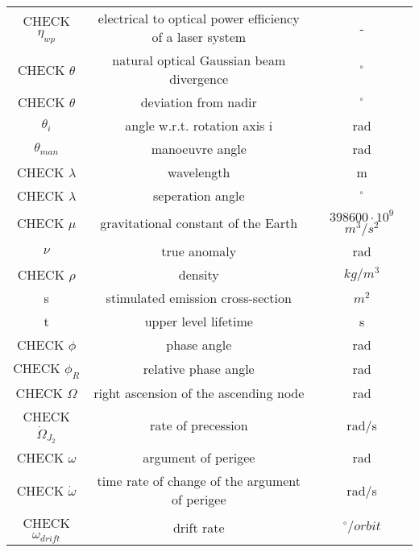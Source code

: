 \documentclass[11pt]{report}
\begin{document}
\begin{center}
\begin{longtable}{c|c|c}
CHECK $\eta_{wp}$                       & electrical to optical power efficiency of a laser system  & - \\

CHECK $\theta$                             & natural optical Gaussian beam divergence       & $^\circ$ \\

CHECK $\theta$                            & deviation from nadir                             &  $^\circ$ \\

$\theta _i$ 												& angle w.r.t. rotation axis i 								& rad \\

$\theta _{man}$ 										& manoeuvre angle 														& rad \\

CHECK $\lambda$ 													& wavelength																	& m \\

CHECK $\lambda$ 													& seperation angle																	& $^\circ$ \\ 

CHECK $\mu$														 		& gravitational constant of the Earth 				& $398600\cdot 10^9$ $m^3/s^2$ \\

$\nu$ 															& true anomaly 																& rad \\

CHECK $\rho$ 															& density 																		& $kg/m^3$ \\

s 																	& stimulated emission cross-section 					& $m^2$ \\

t 																	& upper level lifetime 												& s \\

CHECK $\phi$ 															& phase angle 																& rad \\
	
CHECK $\phi _R$														& relative phase angle 												& rad \\
     
CHECK $\Omega$ 														& right ascension of the ascending node 			& rad \\

CHECK $\dot \Omega _{J_2 }$ 							& rate of precession 													& rad/s \\

CHECK $\omega$ 														& argument of perigee													& rad \\

CHECK $\dot \omega$ 											& time rate of change of the argument of perigee & rad/s\\

CHECK $\omega_{drift}$                    & drift rate                                  & $^\circ/orbit$ \\
 
\end{longtable}
\end{center}
\end{document}
